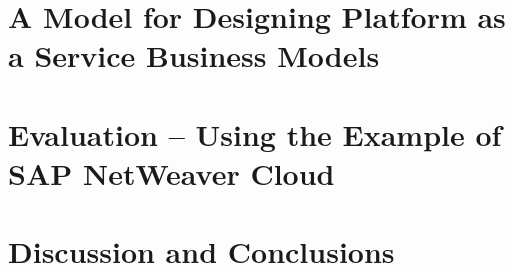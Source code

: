 \documentclass[12pt,a4paper,oneside,notitlepage,USenglish]{scrreprt}
\begin{document}







			
			\chapter{A Model for Designing Platform as a Service Business Models}\label{ch:sd}

			\chapter{Evaluation -- Using the Example of SAP NetWeaver Cloud}\label{ch:e}

			\chapter{Discussion and Conclusions}\label{ch:dc}













\appendix
\titleformat{\chapter}{\Large}{\textbf{\appendixname~\Large\thechapter}}{15pt}{\textbf}



\end{document}
